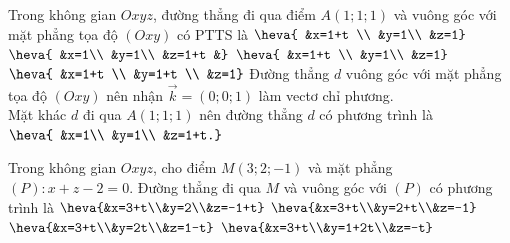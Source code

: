 \begin{ex}%
	Trong không gian $Oxyz$, đường thẳng đi qua điểm $A(1; 1; 1)$ và vuông góc với mặt phẳng tọa độ $(Oxy)$ có PTTS là
	\choice
	{$\heva{	&x=1+t \\
			&y=1\\
			&z=1}$}
	{\True $\heva{	&x=1\\
			&y=1\\
			&z=1+t
			&}$}
	{$\heva{	&x=1+t \\
			&y=1\\
			&z=1}$}
	{$\heva{	&x=1+t \\
			&y=1+t \\
			&z=1}$}
	\loigiai
		{Đường thẳng $d$ vuông góc với mặt phẳng tọa độ $(Oxy)$ nên nhận $\overrightarrow{k}=(0; 0; 1)$ làm vectơ  chỉ phương.\\
		Mặt khác $d$ đi qua $A(1; 1; 1)$ nên đường thẳng $d$ có phương trình là $\heva{	&x=1\\
			&y=1\\
			&z=1+t.}$
		}
\end{ex}
\begin{ex}%
	Trong không gian $Oxyz$, cho điểm $M(3;2 ;-1)$ và mặt phẳng $(P)\colon x+z-2=0$. Đường thẳng đi qua $M$ và vuông góc với $(P)$ có phương trình là
	\choice
	{\True $\heva{&x=3+t\\&y=2\\&z=-1+t}$}
	{$\heva{&x=3+t\\&y=2+t\\&z=-1}$}
	{$\heva{&x=3+t\\&y=2t\\&z=1-t}$}
	{$\heva{&x=3+t\\&y=1+2t\\&z=-t}$}
\end{ex}
